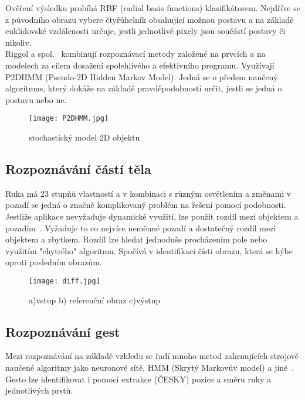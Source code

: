 Ověření výsledku probíhá RBF (radial basis functions) klasifikátorem. Nejdříve se z původního obrazu vybere čtyřúhelník obsahující možnou postavu a na základě euklidovské vzdálenosti určuje, jestli jednotlivé pixely jsou součástí postavy či nikoliv.\\

Riggol a spol.~\cite{11} kombinují rozpoznávací metody založené na prvcích a na modelech za cílem dosažení spolehlivého a efektivního programu. Využívají P2DHMM (Pseudo-2D Hidden Markov Model). Jedná se o předem naučený algoritmus, který dokáže na základě pravděpodobností určit, jestli se jedná o postavu nebo ne.\\
\begin{figure}[h]
\centering
\texttt{[image: P2DHMM.jpg]}
\caption{stochastický model 2D objektu ~\cite{11} } %
\end{figure}


\subsection{Rozpoznávání částí těla}
Ruka má 23 stupňů vlastností a v kombinaci s různým osvětlením a změnami v pozadí se jedná o značně komplikovaný problém na řešení pomocí podobnosti.\\

Jestliže aplikace nevyžaduje dynamické využití, lze použít rozdíl mezi objektem a pozadím~\cite{14}. Vyžaduje to co nejvíce neměnné pozadí a dostatečný rozdíl mezi objektem a zbytkem. Rozdíl lze hledat jednoduše procházením pole nebo využitím "chytrého" algoritmu. Spočívá v identifikaci čísti obrazu, která se hýbe oproti posledním obrazům.
\begin{figure}[h]
\centering
\texttt{[image: diff.jpg]}
\caption{a)vstup  b) referenční obraz  c)výstup ~\cite{14} } 
\end{figure}


\subsection{Rozpoznávání gest}
Mezi rozpoznávání na základě vzhledu se řadí mnoho metod zahrnujících strojově naučené algoritmy jako neuronové sítě, HMM (Skrytý Markovův model) a jiné~\cite{3}. Gesto lze identifikovat i pomocí extrakce (ČESKY) pozice a směru ruky a jednotlivých prstů.\\

